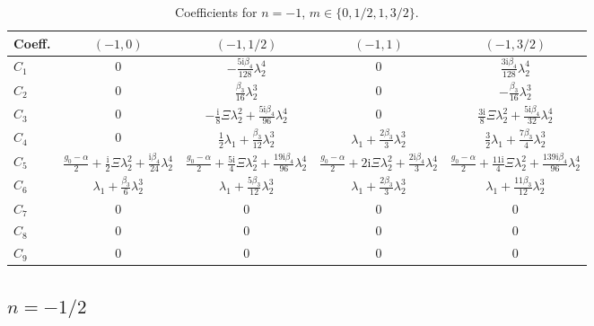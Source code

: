\documentclass[11pt]{article}
\newcommand{\ii}{\mathrm{i}}
\begin{document}
\begin{table}[htbp]
\centering\small
\caption{Coefficients for $n=-1$, $m\in\{0,1/2,1,3/2\}$.}
\label{tab:nneg1-0}
\begin{tabular}{lcccc}
\toprule
Coeff. & $(-1,0)$ & $(-1,1/2)$ & $(-1,1)$ & $(-1,3/2)$ \\
\midrule
$C_1$ & $0$ & $-\tfrac{5\ii\beta_4}{128}\lambda_2^4$ & $0$ & $\tfrac{3\ii\beta_4}{128}\lambda_2^4$ \\
$C_2$ & $0$ & $\tfrac{\beta_3}{16}\lambda_2^3$ & $0$ & $-\tfrac{\beta_3}{16}\lambda_2^3$ \\
$C_3$ & $0$ & $-\tfrac{\ii}{8}\Xi\lambda_2^2+\tfrac{5\ii\beta_4}{96}\lambda_2^4$ & $0$ & $\tfrac{3\ii}{8}\Xi\lambda_2^2+\tfrac{5\ii\beta_4}{32}\lambda_2^4$ \\
$C_4$ & $0$ & $\tfrac12\lambda_1+\tfrac{\beta_3}{12}\lambda_2^3$ & $\lambda_1+\tfrac{2\beta_3}{3}\lambda_2^3$ & $\tfrac32\lambda_1+\tfrac{7\beta_3}{4}\lambda_2^3$ \\
$C_5$ & $\tfrac{g_0-\alpha}{2}+\tfrac{\ii}{2}\Xi\lambda_2^2+\tfrac{\ii\beta_4}{24}\lambda_2^4$ & $\tfrac{g_0-\alpha}{2}+\tfrac{5\ii}{4}\Xi\lambda_2^2+\tfrac{19\ii\beta_4}{96}\lambda_2^4$ & $\tfrac{g_0-\alpha}{2}+2\ii\Xi\lambda_2^2+\tfrac{2\ii\beta_4}{3}\lambda_2^4$ & $\tfrac{g_0-\alpha}{2}+\tfrac{11\ii}{4}\Xi\lambda_2^2+\tfrac{139\ii\beta_4}{96}\lambda_2^4$ \\
$C_6$ & $\lambda_1+\tfrac{\beta_3}{6}\lambda_2^3$ & $\lambda_1+\tfrac{5\beta_3}{12}\lambda_2^3$ & $\lambda_1+\tfrac{2\beta_3}{3}\lambda_2^3$ & $\lambda_1+\tfrac{11\beta_3}{12}\lambda_2^3$ \\
$C_7$ & $0$ & $0$ & $0$ & $0$ \\
$C_8$ & $0$ & $0$ & $0$ & $0$ \\
$C_9$ & $0$ & $0$ & $0$ & $0$ \\
\bottomrule
\end{tabular}
\end{table}

\subsection{$n=-1/2$}
\end{document}
